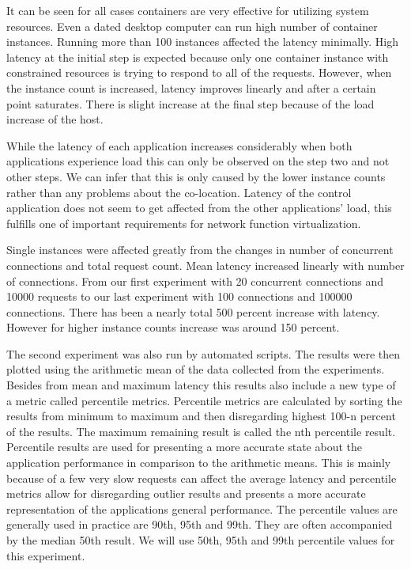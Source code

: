 \documentclass[12pt,oneandhalf,chaparabic,ceng,ms,eng,oneside,pntc]{gsufbe}
\begin{document}
It can be seen for all cases containers are very effective for utilizing system resources. Even a dated desktop
computer can run high number of container instances.  Running more than 100 instances affected the latency minimally.
High latency at the initial step is expected because only one container instance with constrained resources
is trying to respond to all of the requests.
However, when the instance count is increased, latency improves linearly and after a certain point saturates.
There is slight increase at the final step because of the load increase of the host.

While the latency of each application increases considerably when both applications experience load this
can
only be observed on the step two and not other steps.  We can infer that this is only caused by the lower
instance counts rather than any problems about the co-location.  Latency of the control application does not
seem to get affected from the other applications' load, this fulfills one of important requirements for
network function virtualization.

Single instances were affected greatly from the changes in number of concurrent connections and total
request count. Mean latency increased linearly with number of connections. From our first experiment
with 20 concurrent connections and 10000 requests to our last experiment with 100 connections and 
100000 connections. There has been a nearly total 500 percent increase with latency. However for higher
instance counts increase was around 150 percent.

The second experiment was also run by automated scripts.  The results were then plotted using the 
arithmetic mean of the data collected from the experiments. Besides from mean and maximum latency this
results also include a new type of a metric called percentile metrics. Percentile metrics are 
calculated by sorting the results from minimum to maximum and then disregarding highest 100-n
percent of the results. The maximum remaining result is called the nth percentile result. Percentile
results are used for presenting a more accurate state about the application performance in comparison to the
arithmetic means.  This is mainly because of a few very slow requests can affect the average latency
and percentile metrics allow for disregarding outlier results and presents a more accurate
representation of the applications general performance. The percentile values are generally used in
practice
are 90th, 95th and 99th. They are often accompanied by the median 50th result. We will use 50th, 95th
and 99th percentile values for this experiment.
\end{document}
